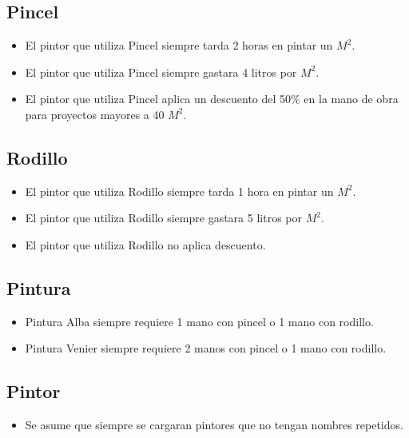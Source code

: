 \documentclass[titlepage,a4paper]{article}
\begin{document}
  \subsection{Pincel}
    \begin{itemize}
      \item El pintor que utiliza Pincel siempre tarda 2 horas en pintar un $M^2$.
      \item El pintor que utiliza Pincel siempre gastara 4 litros por $M^2$.
      \item El pintor que utiliza Pincel aplica un descuento del 50\% en la mano de obra para proyectos mayores a 40 $M^2$.
    \end{itemize}

  \subsection{Rodillo}
    \begin{itemize}
      \item El pintor que utiliza Rodillo siempre tarda 1 hora en pintar un $M^2$.
      \item El pintor que utiliza Rodillo siempre gastara 5 litros por $M^2$.
      \item El pintor que utiliza Rodillo no aplica descuento.
    \end{itemize}

  \subsection{Pintura}
    \begin{itemize}
      \item Pintura Alba siempre requiere 1 mano con pincel o 1 mano con rodillo.
      \item Pintura Venier siempre requiere 2 manos con pincel o 1 mano con rodillo.
    \end{itemize}

  \subsection{Pintor}
    \begin{itemize}
      \item Se asume que siempre se cargaran pintores que no tengan nombres repetidos.
    \end{itemize}
  

\newpage
\end{document}
